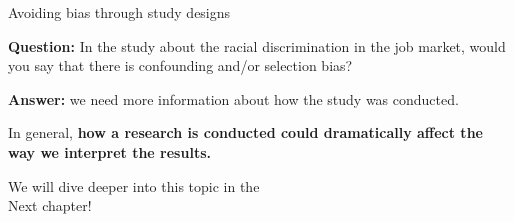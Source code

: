 \documentclass[aspectratio=169]{beamer}
\begin{document}
\begin{frame}{Avoiding bias through study designs}

    \textbf{Question:} In the study about the racial discrimination in the job market, would you say that there is confounding and/or selection bias?
    \vspace{0.2cm}
    
    \textbf{Answer:} we need more information about how the study was conducted.
    \vspace{0.9cm}

    In general, \textbf{how a research is conducted could dramatically affect the way we interpret the results.}
   \vspace{0.3cm}
    \begin{center}
         We will dive deeper into this topic in the \\
        Next chapter!
    \end{center}
    
\end{frame}



    

    

    
\end{document}
